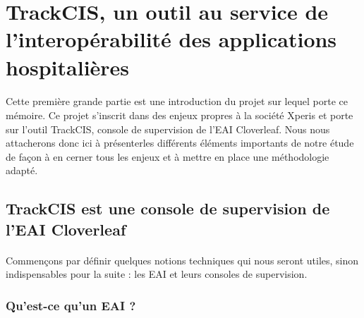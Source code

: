 \newpage
\section{TrackCIS, un outil au service de l'interopérabilité des applications hospitalières}
	\paragraph{}
	Cette première grande partie est une introduction du projet sur lequel porte ce
	mémoire. Ce projet s'inscrit dans des enjeux propres à la société Xperis et
	porte sur l'outil TrackCIS, console de supervision de l'EAI Cloverleaf. Nous
	nous attacherons donc ici à présenterles différents éléments importants de
	notre étude de façon à en cerner tous les enjeux et à mettre en place une
	méthodologie adapté.

	\subsection{TrackCIS est une console de supervision de l'EAI Cloverleaf}
		\paragraph{}
		Commençons par définir quelques notions techniques qui nous seront utiles,
		sinon indispensables pour la suite : les EAI et leurs consoles de supervision.
		
		\subsubsection{Qu'est-ce qu'un EAI ?}

